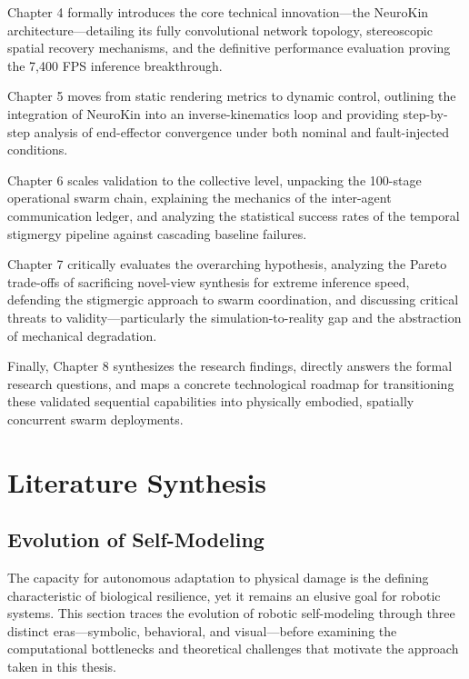 \documentclass[12pt,a4paper,oneside]{report}
\begin{document}
Chapter 4 formally introduces the core technical innovation—the NeuroKin architecture—detailing its fully convolutional network topology, stereoscopic spatial recovery mechanisms, and the definitive performance evaluation proving the 7,400 FPS inference breakthrough.

Chapter 5 moves from static rendering metrics to dynamic control, outlining the integration of NeuroKin into an inverse-kinematics loop and providing step-by-step analysis of end-effector convergence under both nominal and fault-injected conditions.

Chapter 6 scales validation to the collective level, unpacking the 100-stage operational swarm chain, explaining the mechanics of the inter-agent communication ledger, and analyzing the statistical success rates of the temporal stigmergy pipeline against cascading baseline failures.

Chapter 7 critically evaluates the overarching hypothesis, analyzing the Pareto trade-offs of sacrificing novel-view synthesis for extreme inference speed, defending the stigmergic approach to swarm coordination, and discussing critical threats to validity—particularly the simulation-to-reality gap and the abstraction of mechanical degradation.

Finally, Chapter 8 synthesizes the research findings, directly answers the formal research questions, and maps a concrete technological roadmap for transitioning these validated sequential capabilities into physically embodied, spatially concurrent swarm deployments.












\chapter{Literature Synthesis}

\section{Evolution of Self-Modeling}

The capacity for autonomous adaptation to physical damage is the defining characteristic of biological resilience, yet it remains an elusive goal for robotic systems. This section traces the evolution of robotic self-modeling through three distinct eras—symbolic, behavioral, and visual—before examining the computational bottlenecks and theoretical challenges that motivate the approach taken in this thesis.
\end{document}

